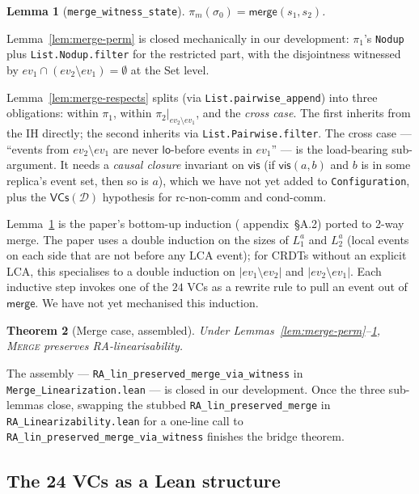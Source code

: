 \documentclass[11pt,a4paper]{article}
\newtheorem{theorem}{Theorem}[section]
\newtheorem{lemma}[theorem]{Lemma}
\theoremstyle{definition}
\theoremstyle{remark}
\newcommand{\RDT}{\ensuremath{\mathcal{D}}}
\newcommand{\mmerge}{\mathsf{merge}}
\newcommand{\mvis}{\mathsf{vis}}
\newcommand{\mlo}{\mathsf{lo}}
\newcommand{\ev}{\mathit{ev}}
\newcommand{\init}{\sigma_0}
\newcommand{\VCs}{\mathsf{VCs}}
\begin{document}
\begin{lemma}[\texttt{merge\_witness\_state}]
\label{lem:merge-state}
$\pi_m(\init) = \mmerge(s_1, s_2)$.
\end{lemma}

Lemma~\ref{lem:merge-perm} is closed mechanically in our
development: $\pi_1$'s \texttt{Nodup} plus \texttt{List.Nodup.filter}
for the restricted part, with the disjointness witnessed by
$\ev_1 \cap (\ev_2 \setminus \ev_1) = \emptyset$ at the Set level.

Lemma~\ref{lem:merge-respects} splits (via \texttt{List.pairwise\_append})
into three obligations: within $\pi_1$, within
$\pi_2\big|_{\ev_2 \setminus \ev_1}$, and the \emph{cross case}.
The first inherits from the IH directly; the second inherits via
\texttt{List.Pairwise.filter}. The cross case ---
``events from $\ev_2 \setminus \ev_1$ are never $\mlo$-before events
in $\ev_1$'' --- is the load-bearing sub-argument. It needs a
\emph{causal closure} invariant on $\mvis$ (if $\mvis(a, b)$ and $b$ is
in some replica's event set, then so is $a$), which we have not yet
added to \texttt{Configuration}, plus the $\VCs(\RDT)$ hypothesis
for rc-non-comm and cond-comm.

Lemma~\ref{lem:merge-state} is the paper's bottom-up induction
(\cite{sal2025} appendix~\S A.2) ported to 2-way merge. The paper
uses a double induction on the sizes of $L_1^a$ and $L_2^a$ (local
events on each side that are not before any LCA event); for CRDTs
without an explicit LCA, this specialises to a double induction on
$|\ev_1 \setminus \ev_2|$ and $|\ev_2 \setminus \ev_1|$. Each
inductive step invokes one of the $24$ VCs as a rewrite rule to
pull an event out of $\mmerge$. We have not yet mechanised this
induction.

\begin{theorem}[Merge case, assembled]
\label{thm:merge-assembled}
Under Lemmas~\ref{lem:merge-perm}--\ref{lem:merge-state},
\textsc{Merge} preserves RA-linearisability.
\end{theorem}

The assembly --- \texttt{RA\_lin\_preserved\_merge\_via\_witness} in
\texttt{Merge\_Linearization.lean} --- is closed in our
development. Once the three sub-lemmas close, swapping the stubbed
\texttt{RA\_lin\_preserved\_merge} in \texttt{RA\_Linearizability.lean}
for a one-line call to
\texttt{RA\_lin\_preserved\_merge\_via\_witness} finishes the bridge
theorem.

\subsection{The 24 VCs as a Lean structure}
\label{sec:satisfies-vcs}
\end{document}
